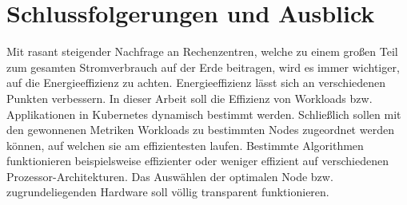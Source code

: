 \chapter{Schlussfolgerungen und Ausblick}

Mit rasant steigender Nachfrage an Rechenzentren, welche zu 
einem großen Teil zum gesamten Stromverbrauch auf der Erde beitragen,
wird es immer wichtiger, auf die Energieeffizienz zu achten.
Energieeffizienz lässt sich an verschiedenen Punkten verbessern.
In dieser Arbeit soll die Effizienz von Workloads bzw. Applikationen in Kubernetes
dynamisch bestimmt werden.
Schließlich sollen mit den gewonnenen Metriken Workloads zu bestimmten Nodes zugeordnet werden können,
auf welchen sie am effizientesten laufen. 
Bestimmte Algorithmen funktionieren beispielsweise
effizienter oder weniger effizient auf verschiedenen Prozessor-Architekturen.
Das Auswählen der optimalen Node bzw. zugrundeliegenden Hardware
soll völlig transparent funktionieren.






